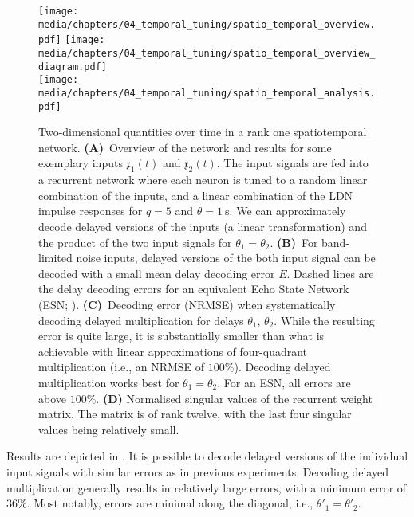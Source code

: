 \begin{figure}
	\centering
	\texttt{[image: media/chapters/04\_temporal\_tuning/spatio\_temporal\_overview.pdf]}%
	\kern-158mm\texttt{[image: media/chapters/04\_temporal\_tuning/spatio\_temporal\_overview\_diagram.pdf]}\\[0.5cm]
	\texttt{[image: media/chapters/04\_temporal\_tuning/spatio\_temporal\_analysis.pdf]}%
	{\label{fig:spatio_temporal_a}}%
	{\label{fig:spatio_temporal_b}}%
	{\label{fig:spatio_temporal_c}}%
	{\label{fig:spatio_temporal_d}}%
	\caption[Two-dimensional quantities over time in a rank one spatiotemporal network]{
		Two-dimensional quantities over time in a rank one spatiotemporal network.
		\textbf{(A)}~Overview of the network and results for some exemplary inputs $\mathfrak{x}_1(t)$ and $\mathfrak{x}_2(t)$.
		The input signals are fed into a recurrent network where each neuron is tuned to a random linear combination of the inputs, and a linear combination of the LDN impulse responses for $q = 5$ and $\theta = \SI{1}{\second}$.
		We can approximately decode delayed versions of the inputs (a linear transformation) and the product of the two input signals for $\theta_1 = \theta_2$.
		\textbf{(B)}~For band-limited noise inputs, delayed versions of the both input signal can be decoded with a small mean delay decoding error $\bar E$. Dashed lines are the delay decoding errors for an equivalent Echo State Network (ESN; \cite{jaeger2004harnessing}).
		\textbf{(C)}~Decoding error (NRMSE) when systematically decoding delayed multiplication for delays $\theta_1$, $\theta_2$.
		While the resulting error is quite large, it is substantially smaller than what is achievable with linear approximations of four-quadrant multiplication (i.e., an NRMSE of $100\%$). Decoding delayed multiplication works best for $\theta_1 = \theta_2$.
		For an ESN, all errors are above $100\%$.
		\textbf{(D)} Normalised singular values of the recurrent weight matrix.
		The matrix is of rank twelve, with the last four singular values being relatively small.
	}
	\label{fig:spatio_temporal}
\end{figure}

Results are depicted in .
It is possible to decode delayed versions of the individual input signals with similar errors as in previous experiments.
Decoding delayed multiplication generally results in relatively large errors, with a minimum error of $36\%$.
Most notably, errors are minimal along the diagonal, i.e., $\theta'_1 = \theta'_2$.

